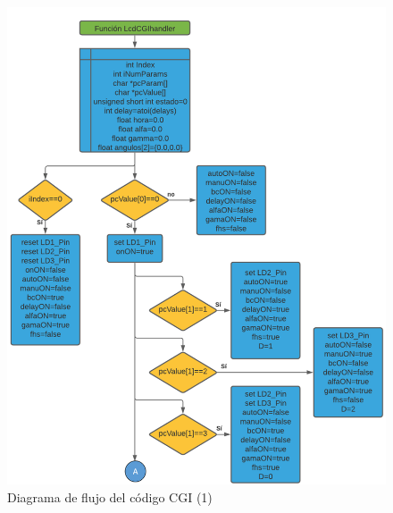\begin{figure}[H]
	\centering
	\includegraphics[width=\columnwidth]{imagenes/Diagrama CGI 1}
	\caption{Diagrama de flujo del código CGI (1)}
	\label{fig:dia_flujCGI1}
\end{figure}

